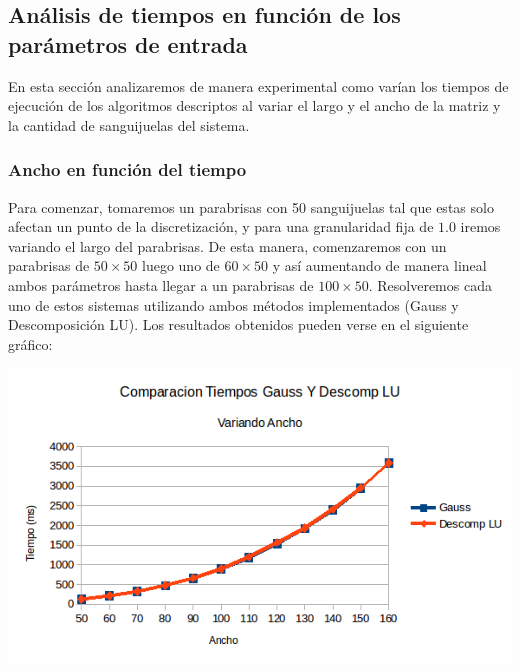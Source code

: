 \subsection{Análisis de tiempos en función de los parámetros de entrada}
En esta sección analizaremos de manera experimental como varían los tiempos de ejecución de los algoritmos descriptos al variar el largo y el ancho de la matriz y la cantidad de sanguijuelas del sistema.

\subsubsection{Ancho en función del tiempo}
Para comenzar, tomaremos un parabrisas con 50 sanguijuelas tal que estas solo afectan un punto de la discretización, y para una granularidad fija de $1.0$ iremos variando el largo del parabrisas. De esta manera, comenzaremos con un parabrisas de $50 \times 50$ luego uno de $60 \times 50$ y así aumentando de manera lineal ambos parámetros hasta llegar a un parabrisas de $100 \times 50$. Resolveremos cada uno de estos sistemas utilizando ambos métodos implementados (Gauss y Descomposición LU). Los resultados obtenidos pueden verse en el siguiente gráfico:

\begin{center}
 \includegraphics[width=400pt]{imagenes/testeo/anchoGauss.png}
\end{center}

